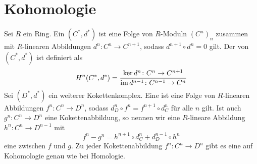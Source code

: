
\newcommand{\fach}{Topologie \RM{2}.}
\newcommand{\semester}{WiSe 2015}
\newcommand{\homepage}{https://wwwmath.uni-muenster.de/reine/u/topos/lehre/WS2015-2016/Topologie2/}

\newcommand{\prof}{Prof.\ Dr.\ Arthur Bartels}
\publishers{\scalebox{11}{\Huge$H^*$}}



\maketitle
\begin{abstract}

\end{abstract}

\tableofcontents
\cleardoubleoddemptypage

\setcounter{page}{1}
\setcounter{footnote}{0}

\section{Kohomologie} %
\label{sec:1}

\begin{definition}[{name=[Kokettenkomplex und Kohomologie]}]
	Sei $R$ ein Ring. 
	Ein  $(C^*,d^*)$ ist eine Folge von $R$-Moduln $(C^n)_{n}$ zusammen mit $R$-linearen Abbildungen $d^n \colon C^n \to C^{n+1}$, sodass $d^{n+1} \circ d^n =0$ gilt. 
	Der  von $(C^*,d^*)$ ist definiert als 
	\[
		H^n(C^*,d^*) = \frac{\ker d^n \colon C^n \to C^{n+1}}{\operatorname{im} d^{n-1} \colon C^{n-1} \to C^n} 
	\]
	Sei $(D^*,d^{*})$ ein weiterer Kokettenkomplex.
	Eine  ist eine Folge von $R$-linearen Abbildungen $f^n\colon C^n\to D^n$, sodass $ d^n_D \circ f^n = f^{n+1}\circ d^n_C$ für alle $n$ gilt. Ist 
	auch $g^n \colon C^n \to D^n$ eine Kokettenabbildung, so nennen wir eine $R$-lineare Abbildung $h^n \colon C^n \to D^{n-1}$ mit
	\[
		f^n - g^n  = h^{n+1} \circ d_C^n + d_D^{n-1} \circ h^n 
	\]
	eine  zwischen $f$ und $g$. Zu jeder Kokettenabbildung $f^n\colon C^n\to D^n$ gibt es eine 
	 auf Kohomologie genau wie bei Homologie.
	
\end{definition}

